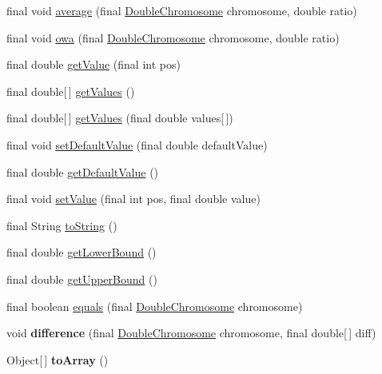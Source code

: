 \begin{CompactItemize}
\item 
final void \hyperlink{classjenes_1_1chromosome_1_1_double_chromosome_83b26a42b307ce1316523e262f044fdd}{average} (final \hyperlink{classjenes_1_1chromosome_1_1_double_chromosome}{DoubleChromosome} chromosome, double ratio)
\item 
final void \hyperlink{classjenes_1_1chromosome_1_1_double_chromosome_eebe5bd21dbc2e8dbbdc135d4d10a4cc}{owa} (final \hyperlink{classjenes_1_1chromosome_1_1_double_chromosome}{DoubleChromosome} chromosome, double ratio)
\item 
final double \hyperlink{classjenes_1_1chromosome_1_1_double_chromosome_cb68cbcac3e7859d4f380530355012c8}{getValue} (final int pos)
\item 
final double\mbox{[}$\,$\mbox{]} \hyperlink{classjenes_1_1chromosome_1_1_double_chromosome_3dea8e4aee9041437b101d1f74d10d1f}{getValues} ()
\item 
final double\mbox{[}$\,$\mbox{]} \hyperlink{classjenes_1_1chromosome_1_1_double_chromosome_0e7543f12f4ab7591f9b4687c44c801c}{getValues} (final double values\mbox{[}$\,$\mbox{]})
\item 
final void \hyperlink{classjenes_1_1chromosome_1_1_double_chromosome_b0f087d0d5ac5ac273c63c4e3af2efff}{setDefaultValue} (final double defaultValue)
\item 
final double \hyperlink{classjenes_1_1chromosome_1_1_double_chromosome_e129a0daa2e01593859f5b26c508d36b}{getDefaultValue} ()
\item 
final void \hyperlink{classjenes_1_1chromosome_1_1_double_chromosome_4581d7735d8ed661473b0e72ff19f956}{setValue} (final int pos, final double value)
\item 
final String \hyperlink{classjenes_1_1chromosome_1_1_double_chromosome_eaf1116586c3fac1fa8c1dad28b7f727}{toString} ()
\item 
final double \hyperlink{classjenes_1_1chromosome_1_1_double_chromosome_a45c550b4cb16cba001dd6c754a5d8bd}{getLowerBound} ()
\item 
final double \hyperlink{classjenes_1_1chromosome_1_1_double_chromosome_7f4fe0c4dd1645f02ebbb2633d6610c8}{getUpperBound} ()
\item 
final boolean \hyperlink{classjenes_1_1chromosome_1_1_double_chromosome_d661abf584ceb5195b6b248798709fc9}{equals} (final \hyperlink{classjenes_1_1chromosome_1_1_double_chromosome}{DoubleChromosome} chromosome)
\item 
\hypertarget{classjenes_1_1chromosome_1_1_double_chromosome_10f461747c9f99c02405626cf82aee46}{
void \textbf{difference} (final \hyperlink{classjenes_1_1chromosome_1_1_double_chromosome}{DoubleChromosome} chromosome, final double\mbox{[}$\,$\mbox{]} diff)}
\label{classjenes_1_1chromosome_1_1_double_chromosome_10f461747c9f99c02405626cf82aee46}

\item 
\hypertarget{classjenes_1_1chromosome_1_1_double_chromosome_101d1eb5ebc632c0c5d0a1c5b65daa90}{
Object\mbox{[}$\,$\mbox{]} \textbf{toArray} ()}
\label{classjenes_1_1chromosome_1_1_double_chromosome_101d1eb5ebc632c0c5d0a1c5b65daa90}

\end{CompactItemize}
